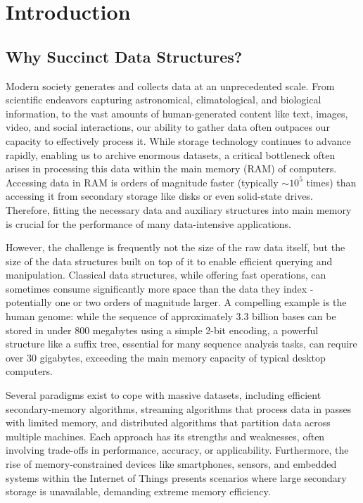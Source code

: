 
\chapter{Introduction} %

\label{ch:introduction} %

\section{Why Succinct Data Structures?}
\label{sec:why_succinct}

Modern society generates and collects data at an unprecedented scale. From scientific endeavors capturing astronomical, climatological, and biological information, to the vast amounts of human-generated content like text, images, video, and social interactions, our ability to gather data often outpaces our capacity to effectively process it. While storage technology continues to advance rapidly, enabling us to archive enormous datasets, a critical bottleneck often arises in processing this data within the main memory (RAM) of computers. Accessing data in RAM is orders of magnitude faster (typically $\sim 10^5$ times) than accessing it from secondary storage like disks or even solid-state drives. Therefore, fitting the necessary data and auxiliary structures into main memory is crucial for the performance of many data-intensive applications.

However, the challenge is frequently not the size of the raw data itself, but the size of the data structures built on top of it to enable efficient querying and manipulation. Classical data structures, while offering fast operations, can sometimes consume significantly more space than the data they index - potentially one or two orders of magnitude larger. A compelling example is the human genome: while the sequence of approximately 3.3 billion bases can be stored in under 800 megabytes using a simple 2-bit encoding, a powerful structure like a suffix tree, essential for many sequence analysis tasks, can require over 30 gigabytes, exceeding the main memory capacity of typical desktop computers. \cite{navarro2016compact}

Several paradigms exist to cope with massive datasets, including efficient secondary-memory algorithms, streaming algorithms that process data in passes with limited memory, and distributed algorithms that partition data across multiple machines. Each approach has its strengths and weaknesses, often involving trade-offs in performance, accuracy, or applicability. Furthermore, the rise of memory-constrained devices like smartphones, sensors, and embedded systems within the Internet of Things presents scenarios where large secondary storage is unavailable, demanding extreme memory efficiency.

